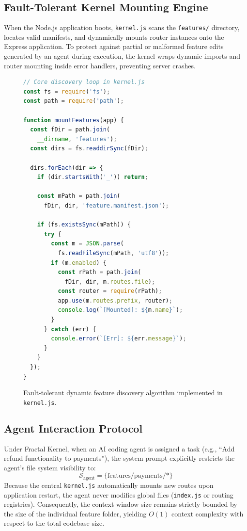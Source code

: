 \documentclass[conference]{IEEEtran}
\begin{document}
\subsection{Fault-Tolerant Kernel Mounting Engine}
When the Node.js application boots, \texttt{kernel.js} scans the \texttt{features/} directory, locates valid manifests, and dynamically mounts router instances onto the Express application. To protect against partial or malformed feature edits generated by an agent during execution, the kernel wraps dynamic imports and router mounting inside error handlers, preventing server crashes.

\begin{figure}[htbp]
\begin{lstlisting}[language=JavaScript]
// Core discovery loop in kernel.js
const fs = require('fs');
const path = require('path');

function mountFeatures(app) {
  const fDir = path.join(
    __dirname, 'features');
  const dirs = fs.readdirSync(fDir);

  dirs.forEach(dir => {
    if (dir.startsWith('_')) return;

    const mPath = path.join(
      fDir, dir, 'feature.manifest.json');

    if (fs.existsSync(mPath)) {
      try {
        const m = JSON.parse(
          fs.readFileSync(mPath, 'utf8'));
        if (m.enabled) {
          const rPath = path.join(
            fDir, dir, m.routes.file);
          const router = require(rPath);
          app.use(m.routes.prefix, router);
          console.log(`[Mounted]: ${m.name}`);
        }
      } catch (err) {
        console.error(`[Err]: ${err.message}`);
      }
    }
  });
}
\end{lstlisting}
\caption{Fault-tolerant dynamic feature discovery algorithm implemented in \texttt{kernel.js}.}
\label{fig:kernel_code}
\end{figure}

\subsection{Agent Interaction Protocol}
Under Fractal Kernel, when an AI coding agent is assigned a task (e.g., ``Add refund functionality to payments''), the system prompt explicitly restricts the agent's file system visibility to:
\begin{equation}
\mathcal{S}_{\text{agent}} = \{\text{features/payments/*}\}
\end{equation}
Because the central \texttt{kernel.js} automatically mounts new routes upon application restart, the agent never modifies global files (\texttt{index.js} or routing registries). Consequently, the context window size remains strictly bounded by the size of the individual feature folder, yielding $O(1)$ context complexity with respect to the total codebase size.
\end{document}
